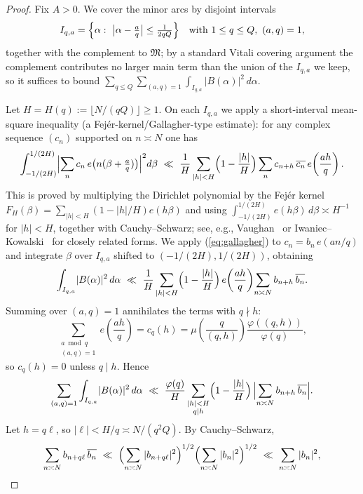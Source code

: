 \documentclass[11pt]{article}
\def\eqref#1{(\ref{#1})}%
\theoremstyle{definition}
\theoremstyle{remark}
\numberwithin{equation}{part}
\begin{document}
\begin{proof}
	Fix $A>0$. We cover the minor arcs by disjoint intervals
	\[
		I_{q,a}=\Bigl\{\alpha:\ \bigl|\alpha-\tfrac{a}{q}\bigr|\le\tfrac{1}{2qQ}\Bigr\}
		\quad\text{with }1\le q\le Q,\ (a,q)=1,
	\]
	together with the complement to $\mathfrak M$; by a standard Vitali covering argument the complement contributes no larger main term than the union of the $I_{q,a}$ we keep, so it suffices to bound $\sum_{q\le Q}\sum_{(a,q)=1}\int_{I_{q,a}}|B(\alpha)|^2\,d\alpha$.

	Let $H=H(q):=\lfloor N/(qQ)\rfloor\ge 1$. On each $I_{q,a}$ we apply a short-interval mean-square inequality (a Fejér-kernel/Gallagher-type estimate): for any complex sequence $(c_n)$ supported on $n\asymp N$ one has
	\begin{equation}\label{eq:gallagher}
		\int_{-1/(2H)}^{1/(2H)}\Bigl|\sum_{n} c_n\,e\bigl(n(\beta+\tfrac{a}{q})\bigr)\Bigr|^2 d\beta
		\ \ll\ \frac{1}{H}\sum_{|h|<H}\Bigl(1-\frac{|h|}{H}\Bigr)
		\sum_{n} c_{n+h}\,\overline{c_n}\,e\!\left(\frac{ah}{q}\right).
	\end{equation}
	This is proved by multiplying the Dirichlet polynomial by the Fejér kernel
	$F_H(\beta)=\sum_{|h|<H}(1-|h|/H)e(h\beta)$ and using
	$\int_{-1/(2H)}^{1/(2H)} e(h\beta)\,d\beta\asymp H^{-1}$ for $|h|<H$, together with Cauchy--Schwarz; see, e.g., Vaughan~\cite[Lemma~3.1]{VaughanHL} or Iwaniec--Kowalski~\cite[Lemma~13.6]{IK} for closely related forms. We apply \eqref{eq:gallagher} to $c_n=b_n\,e(an/q)$ and integrate $\beta$ over $I_{q,a}$ shifted to $(-1/(2H),1/(2H))$, obtaining
	\[
		\int_{I_{q,a}}\!|B(\alpha)|^2\,d\alpha
		\ \ll\ \frac{1}{H}\sum_{|h|<H}\Bigl(1-\frac{|h|}{H}\Bigr)\,
		e\!\left(\frac{ah}{q}\right)\!
		\sum_{n\asymp N} b_{n+h}\,\overline{b_n}.
	\]
	Summing over $(a,q)=1$ annihilates the terms with $q\nmid h$:
	\[
		\sum_{\substack{a\bmod q\\(a,q)=1}} e\!\left(\frac{ah}{q}\right)
		= c_q(h)=\mu\!\left(\frac{q}{(q,h)}\right)\frac{\varphi((q,h))}{\varphi(q)},
	\]
	so $c_q(h)=0$ unless $q\mid h$. Hence
	\[
		\sum_{\substack{(a,q)=1}}\int_{I_{q,a}}\!|B(\alpha)|^2\,d\alpha
		\ \ll\ \frac{\varphi(q)}{H}\sum_{\substack{|h|<H\\ q\mid h}}
		\Bigl(1-\frac{|h|}{H}\Bigr)\,\Bigl|\sum_{n\asymp N} b_{n+h}\,\overline{b_n}\Bigr|.
	\]
	Let $h= q\ell$, so $|\ell|<H/q\asymp N/(q^2 Q)$. By Cauchy--Schwarz,
	\[
		\sum_{n\asymp N} b_{n+q\ell}\,\overline{b_n}
		\ \ll\ \Bigl(\sum_{n\asymp N}|b_{n+q\ell}|^2\Bigr)^{1/2}
		\Bigl(\sum_{n\asymp N}|b_n|^2\Bigr)^{1/2}
		\ \ll\ \sum_{n\asymp N}|b_n|^2,
\]
\end{proof}
\end{document}
